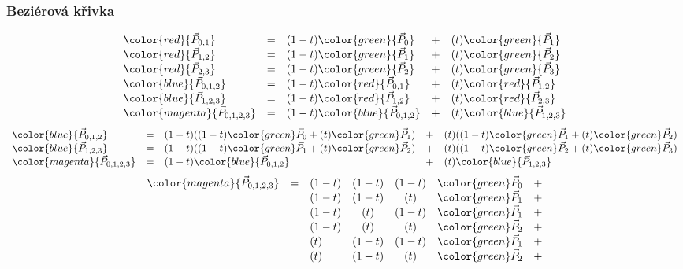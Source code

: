 \begin{frame}
\frametitle{Beziérová křivka}
  {\tiny
  \[
  \begin{array}{lclcl}
    \color{red}    {\vec{P}_{0,1}    } &=& (1-t)\color{green}{\vec{P}_0      } &+& (t)\color{green}{\vec{P}_1      } \\
    \color{red}    {\vec{P}_{1,2}    } &=& (1-t)\color{green}{\vec{P}_1      } &+& (t)\color{green}{\vec{P}_2      } \\
    \color{red}    {\vec{P}_{2,3}    } &=& (1-t)\color{green}{\vec{P}_2      } &+& (t)\color{green}{\vec{P}_3      } \\
    \color{blue}   {\vec{P}_{0,1,2}  } &=& (1-t)\color{red}  {\vec{P}_{0,1}  } &+& (t)\color{red}  {\vec{P}_{1,2}  } \\
    \color{blue}   {\vec{P}_{1,2,3}  } &=& (1-t)\color{red}  {\vec{P}_{1,2}  } &+& (t)\color{red}  {\vec{P}_{2,3}  } \\
    \color{magenta}{\vec{P}_{0,1,2,3}} &=& (1-t)\color{blue} {\vec{P}_{0,1,2}} &+& (t)\color{blue} {\vec{P}_{1,2,3}} 
  \end{array}
  \]
  }
  {\tiny
  \[
  \begin{array}{lclcl}
    \color{blue}   {\vec{P}_{0,1,2}  } &=& (1-t)((1-t){\color{green}\vec{P}_0} + (t){\color{green}\vec{P}_1}) &+& (t)((1-t){\color{green}\vec{P}_1} + (t){\color{green}\vec{P}_2}) \\
    \color{blue}   {\vec{P}_{1,2,3}  } &=& (1-t)((1-t){\color{green}\vec{P}_1} + (t){\color{green}\vec{P}_2}) &+& (t)((1-t){\color{green}\vec{P}_2} + (t){\color{green}\vec{P}_3}) \\
    \color{magenta}{\vec{P}_{0,1,2,3}} &=& (1-t)\color{blue} {\vec{P}_{0,1,2}} &+& (t)\color{blue} {\vec{P}_{1,2,3}} 
  \end{array}
  \]
  }
  {\tiny
  \[
  \begin{array}{lclccrc}
    \color{magenta}{\vec{P}_{0,1,2,3}} &=& (1-t)&(1-t)&(1-t)&{\color{green}\vec{P}_0} &+ \\
                                       & & (1-t)&(1-t)&(  t)&{\color{green}\vec{P}_1} &+ \\
                                       & & (1-t)&(  t)&(1-t)&{\color{green}\vec{P}_1} &+ \\
                                       & & (1-t)&(  t)&(  t)&{\color{green}\vec{P}_2} &+ \\
                                       & & (  t)&(1-t)&(1-t)&{\color{green}\vec{P}_1} &+ \\
                                       & & (  t)&(1-t)&(  t)&{\color{green}\vec{P}_2} &+ \\

\end{array}\]}
\end{frame}
